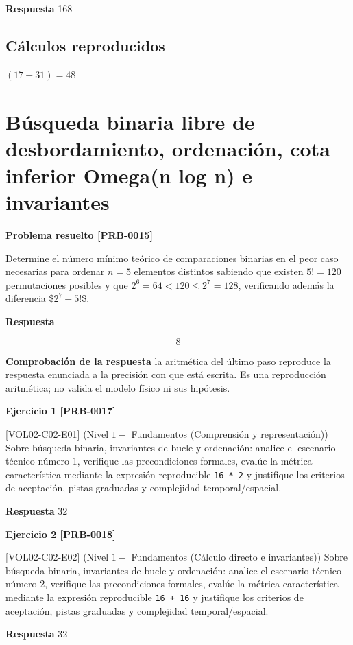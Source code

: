 \documentclass{book}
\begin{document}
\noindent\textbf{Respuesta} 168

\subsection*{Cálculos reproducidos}

\(\left(17+31\right) = 48\)

\section{Búsqueda binaria libre de desbordamiento, ordenación, cota inferior Omega(n log n) e invariantes}

\noindent\textbf{Problema resuelto [PRB-0015]}

Determine el número mínimo teórico de comparaciones binarias en el peor caso necesarias para ordenar \(n = 5\) elementos distintos sabiendo que existen \(5! = 120\) permutaciones posibles y que \(2^6 = 64 < 120 \le 2^7 = 128\), verificando además la diferencia \$\(2^7 - 5\)!\$.

\noindent\textbf{Respuesta}

\[
8
\]

\noindent\textbf{Comprobación de la respuesta} la aritmética del último paso reproduce la respuesta enunciada a la precisión con que está escrita. Es una reproducción aritmética; no valida el modelo físico ni sus hipótesis.

\noindent\textbf{Ejercicio 1 [PRB-0017]}

[VOL02-C02-E01] (Nivel \(1 -\) Fundamentos (Comprensión y representación)) Sobre búsqueda binaria, invariantes de bucle y ordenación: analice el escenario técnico número 1, verifique las precondiciones formales, evalúe la métrica característica mediante la expresión reproducible \texttt{16 * 2} y justifique los criterios de aceptación, pistas graduadas y complejidad temporal/espacial.

\noindent\textbf{Respuesta} 32

\noindent\textbf{Ejercicio 2 [PRB-0018]}

[VOL02-C02-E02] (Nivel \(1 -\) Fundamentos (Cálculo directo e invariantes)) Sobre búsqueda binaria, invariantes de bucle y ordenación: analice el escenario técnico número 2, verifique las precondiciones formales, evalúe la métrica característica mediante la expresión reproducible \texttt{16 + 16} y justifique los criterios de aceptación, pistas graduadas y complejidad temporal/espacial.

\noindent\textbf{Respuesta} 32
\end{document}
